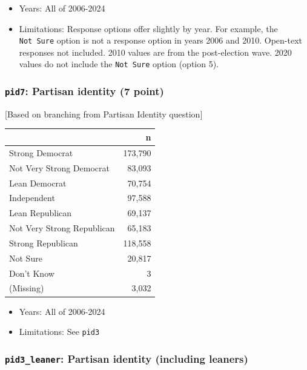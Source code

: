 \documentclass[10pt,article,oneside]{memoir}
\begin{document}
\begin{itemize}
\tightlist
\item
  Years: All of 2006-2024
\item
  Limitations: Response options offer slightly by year. For example, the
  \texttt{Not\ Sure} option is not a response option in years 2006 and
  2010. Open-text responses not included. 2010 values are from the
  post-election wave. 2020 values do not include the \texttt{Not\ Sure}
  option (option 5).
\end{itemize}

\subsubsection{\texorpdfstring{\texttt{pid7}: Partisan identity (7
point)}{pid7: Partisan identity (7 point)}}\label{pid7-partisan-identity-7-point}

{[}Based on branching from Partisan Identity question{]}

\begin{table}[H]
\centering
\begin{tabular}[t]{lr}
\toprule
 & n\\
\midrule
Strong Democrat & 173,790\\
Not Very Strong Democrat & 83,093\\
Lean Democrat & 70,754\\
Independent & 97,588\\
Lean Republican & 69,137\\
Not Very Strong Republican & 65,183\\
Strong Republican & 118,558\\
Not Sure & 20,817\\
Don't Know & 3\\
(Missing) & 3,032\\
\bottomrule
\end{tabular}
\end{table}

\begin{itemize}
\tightlist
\item
  Years: All of 2006-2024
\item
  Limitations: See \texttt{pid3}
\end{itemize}

\subsubsection{\texorpdfstring{\texttt{pid3\_leaner}: Partisan identity
(including
leaners)}{pid3\_leaner: Partisan identity (including leaners)}}\label{pid3_leaner-partisan-identity-including-leaners}
\end{document}
